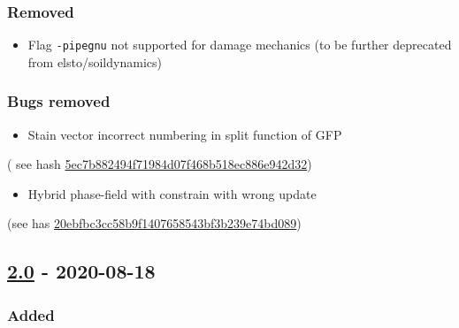 \subsubsection{Removed}

\begin{itemize}
\tightlist
\item
  Flag \lstinline!-pipegnu! not supported for damage mechanics (to be
  further deprecated from elsto/soildynamics)
\end{itemize}

\subsubsection{Bugs removed}

\begin{itemize}
\tightlist
\item
  Stain vector incorrect numbering in split function of GFP
\end{itemize}

( see hash
\href{https://codev-tuleap.intra.cea.fr/plugins/git/hpcseism/freefem?a=commit\&h=5ec7b882494f71984d07f468b518ec886e942d32}{5ec7b882494f71984d07f468b518ec886e942d32})

\begin{itemize}
\tightlist
\item
  Hybrid phase-field with constrain with wrong update
\end{itemize}

(see has
\href{https://codev-tuleap.intra.cea.fr/plugins/git/hpcseism/freefem?a=commit\&h=20ebfbc3cc58b9f1407658543bf3b239e74bd089}{20ebfbc3cc58b9f1407658543bf3b239e74bd089})

\subsection{\texorpdfstring{\href{https://gitlab.com/PsdSolver/psd_sources/-/tree/v2.0}{2.0}
- 2020-08-18}{2.0 - 2020-08-18}}

\subsubsection{Added}

